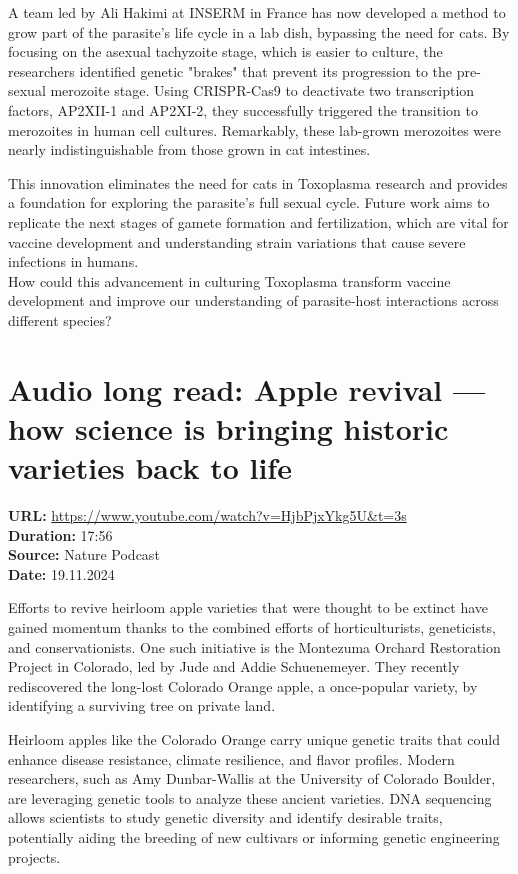 \documentclass[12pt]{article}
\begin{document}
A team led by Ali Hakimi at INSERM in France has now developed a method to grow part of the parasite's life cycle in a lab dish, bypassing the need for cats. By focusing on the asexual tachyzoite stage, which is easier to culture, the researchers identified genetic "brakes" that prevent its progression to the pre-sexual merozoite stage. Using CRISPR-Cas9 to deactivate two transcription factors, AP2XII-1 and AP2XI-2, they successfully triggered the transition to merozoites in human cell cultures. Remarkably, these lab-grown merozoites were nearly indistinguishable from those grown in cat intestines.  

This innovation eliminates the need for cats in Toxoplasma research and provides a foundation for exploring the parasite's full sexual cycle. Future work aims to replicate the next stages of gamete formation and fertilization, which are vital for vaccine development and understanding strain variations that cause severe infections in humans.\\[5px]  
 
How could this advancement in culturing Toxoplasma transform vaccine development and improve our understanding of parasite-host interactions across different species?  





\newpage

\section{Audio long read: Apple revival — how science is bringing historic varieties back to life}
\textbf{URL:} \url{https://www.youtube.com/watch?v=HjbPjxYkg5U&t=3s}\\
\textbf{Duration:} 17:56\\
\textbf{Source:} Nature Podcast\\
\textbf{Date:} 19.11.2024


 

Efforts to revive heirloom apple varieties that were thought to be extinct have gained momentum thanks to the combined efforts of horticulturists, geneticists, and conservationists. One such initiative is the Montezuma Orchard Restoration Project in Colorado, led by Jude and Addie Schuenemeyer. They recently rediscovered the long-lost Colorado Orange apple, a once-popular variety, by identifying a surviving tree on private land.  

Heirloom apples like the Colorado Orange carry unique genetic traits that could enhance disease resistance, climate resilience, and flavor profiles. Modern researchers, such as Amy Dunbar-Wallis at the University of Colorado Boulder, are leveraging genetic tools to analyze these ancient varieties. DNA sequencing allows scientists to study genetic diversity and identify desirable traits, potentially aiding the breeding of new cultivars or informing genetic engineering projects.
\end{document}
